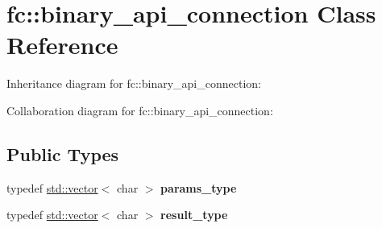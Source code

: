 \hypertarget{classfc_1_1binary__api__connection}{}\section{fc\+:\+:binary\+\_\+api\+\_\+connection Class Reference}
\label{classfc_1_1binary__api__connection}


Inheritance diagram for fc\+:\+:binary\+\_\+api\+\_\+connection\+:


Collaboration diagram for fc\+:\+:binary\+\_\+api\+\_\+connection\+:
\subsection*{Public Types}
\begin{DoxyCompactItemize}
\item 
\mbox{\label{classfc_1_1binary__api__connection_a5cd517232544117270d959d4eceec9a8}} 
typedef \mbox{\hyperlink{classstd_1_1vector}{std\+::vector}}$<$ char $>$ {\bfseries params\+\_\+type}
\item 
\mbox{\label{classfc_1_1binary__api__connection_a46e3e3672d36e425939c515e05090d57}} 
typedef \mbox{\hyperlink{classstd_1_1vector}{std\+::vector}}$<$ char $>$ {\bfseries result\+\_\+type}
\end{DoxyCompactItemize}
